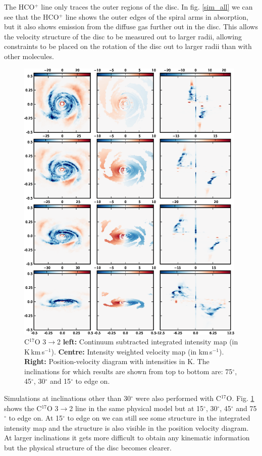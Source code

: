 \documentclass[useAMS,usenatbib]{mn2e}
\begin{document}
The HCO$^+$ line only traces the outer regions of the disc. In fig. \ref{sim_all} we can see that the HCO$^+$ line shows the outer edges of the spiral arms in absorption, but it also shows emission from the diffuse gas further out in the disc. This allows the velocity structure of the disc to be measured out to larger radii, allowing constraints to be placed on the rotation of the disc out to larger radii than with other molecules. 

\begin{figure}
 \includegraphics[width=110mm]{Figures/sim/fig09.eps}
 \caption{C$^{17}$O 3$\rightarrow$2 {\bf left:} Continuum subtracted integrated intensity map (in K$\,$km$\,$s$^{-1}$). {\bf Centre:} Intensity weighted velocity map (in km$\,$s$^{-1}$). {\bf Right:} Position-velocity diagram with intensities in K. The inclinations for which results are shown from top to bottom are: 75$^\circ$, 45$^\circ$, 30$^\circ$ and 15$^\circ$ to edge on.}
 \label{other_inc}
\end{figure}

Simulations at inclinations other than 30$^\circ$ were also performed with C$^{17}$O. Fig. \ref{other_inc} shows the C$^{17}$O 3$\rightarrow$2 line in the same physical model but at 15$^\circ$, 30$^\circ$, 45$^\circ$ and 75$^\circ$ to edge on. At 15$^\circ$ to edge on we can still see some structure in the integrated intensity map and the structure is also visible in the position velocity diagram. At larger inclinations it gets more difficult to obtain any kinematic information but the physical structure of the disc becomes clearer.
\end{document}
